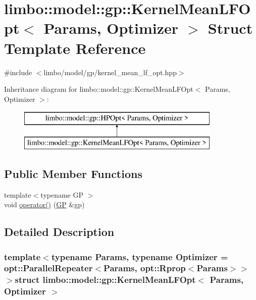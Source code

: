 \hypertarget{structlimbo_1_1model_1_1gp_1_1_kernel_mean_l_f_opt}{}\section{limbo\+:\+:model\+:\+:gp\+:\+:Kernel\+Mean\+L\+F\+Opt$<$ Params, Optimizer $>$ Struct Template Reference}
\label{structlimbo_1_1model_1_1gp_1_1_kernel_mean_l_f_opt}


{\ttfamily \#include $<$limbo/model/gp/kernel\+\_\+mean\+\_\+lf\+\_\+opt.\+hpp$>$}

Inheritance diagram for limbo\+:\+:model\+:\+:gp\+:\+:Kernel\+Mean\+L\+F\+Opt$<$ Params, Optimizer $>$\+:\begin{figure}[H]
\begin{center}
\leavevmode
\includegraphics[height=2.000000cm]{structlimbo_1_1model_1_1gp_1_1_kernel_mean_l_f_opt}
\end{center}
\end{figure}
\subsection*{Public Member Functions}
\begin{DoxyCompactItemize}
\item 
{\footnotesize template$<$typename G\+P $>$ }\\void \hyperlink{structlimbo_1_1model_1_1gp_1_1_kernel_mean_l_f_opt_afdd30bef6dbad7b8f6e459bcea7f4412}{operator()} (\hyperlink{classlimbo_1_1model_1_1_g_p}{G\+P} \&gp)
\end{DoxyCompactItemize}


\subsection{Detailed Description}
\subsubsection*{template$<$typename Params, typename Optimizer = opt\+::\+Parallel\+Repeater$<$\+Params, opt\+::\+Rprop$<$\+Params$>$$>$$>$struct limbo\+::model\+::gp\+::\+Kernel\+Mean\+L\+F\+Opt$<$ Params, Optimizer $>$}

